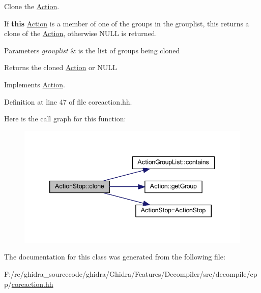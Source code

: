 Clone the \mbox{\hyperlink{class_action}{Action}}. 

If {\bfseries{this}} \mbox{\hyperlink{class_action}{Action}} is a member of one of the groups in the grouplist, this returns a clone of the \mbox{\hyperlink{class_action}{Action}}, otherwise N\+U\+LL is returned. 
\begin{DoxyParams}{Parameters}
{\em grouplist} & is the list of groups being cloned \\
\hline
\end{DoxyParams}
\begin{DoxyReturn}{Returns}
the cloned \mbox{\hyperlink{class_action}{Action}} or N\+U\+LL 
\end{DoxyReturn}


Implements \mbox{\hyperlink{class_action_af8242e41d09e5df52f97df9e65cc626f}{Action}}.



Definition at line 47 of file coreaction.\+hh.

Here is the call graph for this function\+:
\nopagebreak
\begin{figure}[H]
\begin{center}
\leavevmode
\includegraphics[width=339pt]{class_action_stop_a3b262cbd121ab1595178c1248ca409a3_cgraph}
\end{center}
\end{figure}


The documentation for this class was generated from the following file\+:\begin{DoxyCompactItemize}
\item 
F\+:/re/ghidra\+\_\+sourcecode/ghidra/\+Ghidra/\+Features/\+Decompiler/src/decompile/cpp/\mbox{\hyperlink{coreaction_8hh}{coreaction.\+hh}}\end{DoxyCompactItemize}
